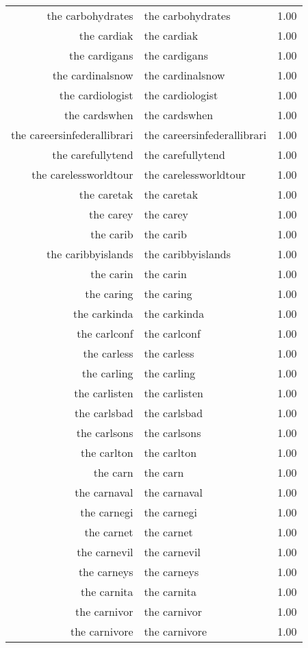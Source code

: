 \begin{table}[ht]
\begin{tabular}{rlr}
  the carbohydrates & the carbohydrates & 1.00 \\ 
  the cardiak & the cardiak & 1.00 \\ 
  the cardigans & the cardigans & 1.00 \\ 
  the cardinalsnow & the cardinalsnow & 1.00 \\ 
  the cardiologist & the cardiologist & 1.00 \\ 
  the cardswhen & the cardswhen & 1.00 \\ 
  the careersinfederallibrari & the careersinfederallibrari & 1.00 \\ 
  the carefullytend & the carefullytend & 1.00 \\ 
  the carelessworldtour & the carelessworldtour & 1.00 \\ 
  the caretak & the caretak & 1.00 \\ 
  the carey & the carey & 1.00 \\ 
  the carib & the carib & 1.00 \\ 
  the caribbyislands & the caribbyislands & 1.00 \\ 
  the carin & the carin & 1.00 \\ 
  the caring & the caring & 1.00 \\ 
  the carkinda & the carkinda & 1.00 \\ 
  the carlconf & the carlconf & 1.00 \\ 
  the carless & the carless & 1.00 \\ 
  the carling & the carling & 1.00 \\ 
  the carlisten & the carlisten & 1.00 \\ 
  the carlsbad & the carlsbad & 1.00 \\ 
  the carlsons & the carlsons & 1.00 \\ 
  the carlton & the carlton & 1.00 \\ 
  the carn & the carn & 1.00 \\ 
  the carnaval & the carnaval & 1.00 \\ 
  the carnegi & the carnegi & 1.00 \\ 
  the carnet & the carnet & 1.00 \\ 
  the carnevil & the carnevil & 1.00 \\ 
  the carneys & the carneys & 1.00 \\ 
  the carnita & the carnita & 1.00 \\ 
  the carnivor & the carnivor & 1.00 \\ 
  the carnivore & the carnivore & 1.00 \\ 

\end{tabular}
\end{table}
